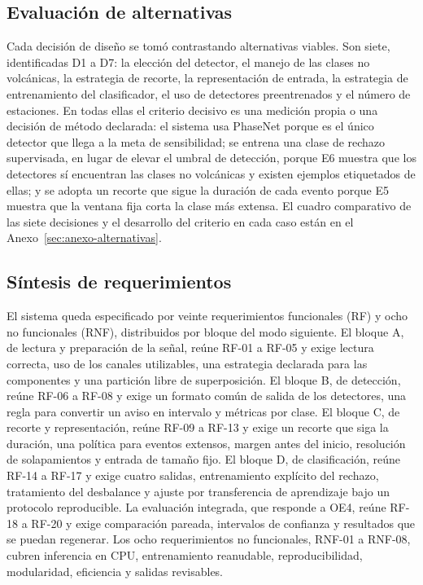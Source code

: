 \subsection{Evaluación de alternativas}
\label{sec:alternativas}

Cada decisión de diseño se tomó contrastando alternativas viables. Son siete,
identificadas D1 a D7: la elección del detector, el manejo de las clases no
volcánicas, la estrategia de recorte, la representación de entrada, la
estrategia de entrenamiento del clasificador, el uso de detectores
preentrenados y el número de estaciones. En todas ellas el criterio decisivo es
una medición propia o una decisión de método declarada: el sistema usa
PhaseNet porque es el único detector que llega a la meta de sensibilidad; se
entrena una clase de rechazo supervisada, en lugar de elevar el umbral de
detección, porque E6 muestra que los detectores sí encuentran las clases no
volcánicas y existen ejemplos etiquetados de ellas; y se adopta un recorte que
sigue la duración de cada evento porque E5 muestra que la ventana fija corta la
clase más extensa. El cuadro comparativo de las siete decisiones y el desarrollo
del criterio en cada caso están en el Anexo~\ref{sec:anexo-alternativas}.

\subsection{Síntesis de requerimientos}
\label{sec:sintesis-req}

El sistema queda especificado por veinte requerimientos funcionales (RF) y ocho
no funcionales (RNF), distribuidos por bloque del modo siguiente. El bloque A,
de lectura y preparación de la señal, reúne RF-01 a RF-05 y exige lectura
correcta, uso de los canales utilizables, una estrategia declarada para las
componentes y una partición libre de superposición. El bloque B, de detección,
reúne RF-06 a RF-08 y exige un formato común de salida de los detectores, una
regla para convertir un aviso en intervalo y métricas por clase. El bloque C, de
recorte y representación, reúne RF-09 a RF-13 y exige un recorte que siga la
duración, una política para eventos extensos, margen antes del inicio,
resolución de solapamientos y entrada de tamaño fijo. El bloque D, de
clasificación, reúne RF-14 a RF-17 y exige cuatro salidas, entrenamiento
explícito del rechazo, tratamiento del desbalance y ajuste por transferencia de
aprendizaje bajo un protocolo reproducible. La evaluación integrada, que
responde a OE4, reúne RF-18 a RF-20 y exige comparación pareada, intervalos de
confianza y resultados que se puedan regenerar. Los ocho requerimientos no
funcionales, RNF-01 a RNF-08, cubren inferencia en CPU, entrenamiento
reanudable, reproducibilidad, modularidad, eficiencia y salidas revisables.

